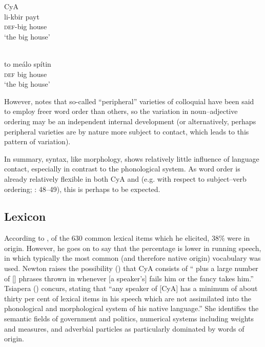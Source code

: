 \documentclass[output=paper]{langsci/langscibook}
\begin{document}
\ex
{CyA}{} {\citealt[47]{Newton1964}}\\
\gll li-kbir payt\\
     \textsc{def}-big house  \\
\glt ‘the big house’

\ex
{}\\
\gll to meálo spítin\\
     \textsc{def} big house  \\
\glt ‘the big house’
\z
\z

However, \citet{Borg2004} notes that so-called “peripheral” varieties of colloquial  have been said to employ freer {word order} than others, so the variation in noun–adjective ordering may be an independent internal development (or alternatively, perhaps peripheral varieties are by nature more subject to contact, which leads to this pattern of variation).


In summary, syntax, like morphology, shows relatively little influence of language contact, especially in contrast to the phonological system. As {word order} is already relatively flexible in both CyA and  (e.g. with respect to subject–verb ordering; \citealt{Newton1964}: 48–49), this is perhaps to be expected.

\subsection{Lexicon}

According to \citet{Newton1964}, of the 630 common lexical items which he elicited, 38\% were  in origin. However, he goes on to say that the percentage is lower in running speech, in which typically the most common (and therefore native  origin) vocabulary was used. Newton raises the possibility (\citeyear[51]{Newton1964}) that CyA consists of “ plus a large number of  [] phrases thrown in whenever [a speaker’s]  fails him or the fancy takes him.” Tsiapera (\citeyear[124]{Tsiapera1964}) concurs, stating that “any speaker of [CyA] has a minimum of about thirty per cent of  lexical items in his speech which are not assimilated into the phonological and morphological system of his native language.” She identifies the semantic fields of government and politics, numerical systems including weights and measures, and adverbial particles as particularly dominated by words of  origin.
\end{document}

